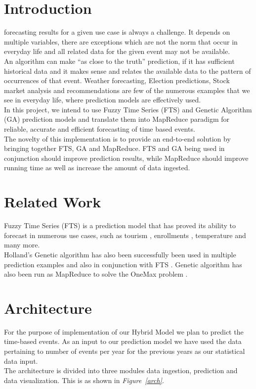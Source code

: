 \documentclass[12pt,journal,compsoc]{IEEEtran}
\begin{document}
\section{Introduction}
 forecasting results for a given use case is always a challenge. It depends on multiple variables, there are exceptions which are not the norm that occur in everyday life and all related data for the given event may not be available.
\\\indent An algorithm can make ``as close to the truth'' prediction, if it has sufficient historical data and  it makes sense and relates the available data to the pattern of occurrences of that event. Weather forecasting, Election predictions, Stock market analysis and recommendations are few of the numerous examples that we see in everyday life, where prediction models are effectively used.
\\\indent In this project, we intend to use Fuzzy Time Series (FTS) \cite{FTS} and Genetic Algorithm (GA) \cite{GA}  prediction models and translate them into MapReduce paradigm for reliable, accurate and efficient forecasting of time based events.  
\\\indent The novelty of this implementation is to provide an end-to-end solution by bringing together FTS, GA and MapReduce. FTS and GA being used in conjunction should improve prediction results, while MapReduce should improve running time as well as increase the amount of data ingested.


\section{Related Work}
\indent Fuzzy Time Series (FTS) \cite{FTS} is a prediction model that has proved its ability to forecast in numerous use cases, such as tourism \cite{FTS-tourism}, enrollments \cite{FTS-enroll}, temperature \cite{FTS-temperature} and many more.
\\\indent Holland's Genetic algorithm \cite{GA} has also been successfully been used in multiple prediction examples \cite{GA-bankruptcy,GA-electric,GAEB} and also in conjunction with FTS \cite{FTS-GA}. Genetic algorithm has also been run as MapReduce to solve the OneMax problem \cite{GA-mapreduce}.

\section{Architecture}
 \indent For the purpose of implementation of our Hybrid Model we plan to predict the time-based events. As an input to our prediction model we have used the data pertaining to number of events per year for the previous years as our statistical data input.
\\\indent The architecture is divided into three modules data ingestion, prediction and data visualization. This is as shown in \emph{Figure~\ref{arch}}. 
\end{document}
